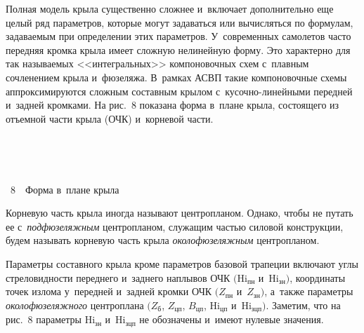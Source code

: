 \begin{multicols}{2}
  
  Полная модель крыла существенно сложнее и~включает дополнительно еще 
целый ряд па\-ра\-мет\-ров, которые могут задаваться или вы\-чис\-лять\-ся по 
формулам, за\-да\-ва\-емым при определении этих па\-ра\-мет\-ров. У~современных 
самолетов час\-то передняя кромка крыла имеет слож\-ную нелинейную форму. 
Это характерно для так на\-зы\-ва\-емых <<интегральных>> компоновочных схем 
с~плав\-ным сочленением крыла и~фюзеляжа. В~рамках \mbox{АСВП} такие 
компоновочные схемы аппроксимируются слож\-ным со\-став\-ным крылом  
с~ку\-соч\-но-ли\-ней\-ны\-ми передней и~задней кромками. На рис.~8 показана 
форма в~плане крыла, со\-сто\-яще\-го из отъемной час\-ти крыла (ОЧК) и~корневой 
части.


  
  \setcounter{figure}{8}
\begin{figure*}[b] %
\vspace*{1pt}
      \begin{center}
     \mbox{%
\epsfxsize=160mm 
}
\end{center}
\vspace*{-9pt}
\end{figure*}

{ \begin{center}  %
 \vspace*{-6pt}
     \mbox{%
\epsfxsize=79mm 
}

\vspace*{6pt}



\noindent
{{\figurename~8}\ \ \small{Форма в~плане крыла
}}
\end{center}
}

\vspace*{6pt}


Корневую часть крыла иногда называют цент\-ро\-пла\-ном. Однако, чтобы не 
путать ее с~\textit{подфюзеляжным} цент\-ро\-пла\-ном, служащим частью силовой 
конструкции, будем называть корневую часть крыла \textit{околофюзеляжным} 
центропланом.


  Параметры составного крыла кроме па\-ра\-мет\-ров базовой трапеции включают 
углы стре\-ло\-вид\-ности переднего и~заднего на\-плы\-вов ОЧК $(\mathrm{Hi}_{\mathrm{пн}}$ 
и~$\mathrm{Hi}_{\mathrm{зн}})$, координаты точек излома у~передней и~зад\-ней кромки ОЧК 
$(Z_{\mathrm{пн}}$ и~$Z_{\mathrm{зн}})$, а~также па\-ра\-мет\-ры 
\textit{околофюзеляжного} центроплана $(Z_\mathrm{б}$, $Z_{\mathrm{цп}}$, 
$B_{\mathrm{цп}}$, $\mathrm{Hi}_{\mathrm{цп}}$ и~$\mathrm{Hi}_{\mathrm{зцп}})$. Заметим, что на рис.~8 
па\-ра\-мет\-ры $\mathrm{Hi}_{\mathrm{зн}}$ и~$\mathrm{Hi}_{\mathrm{зцп}}$ не обозначены и~имеют 
нулевые значения.
  

\end{multicols}
